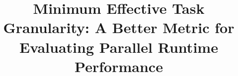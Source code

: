 \documentclass[sigconf,review]{acmart}
\begin{document}
\title{Minimum Effective Task Granularity: A Better Metric for Evaluating Parallel Runtime Performance}






\maketitle


\end{document}
